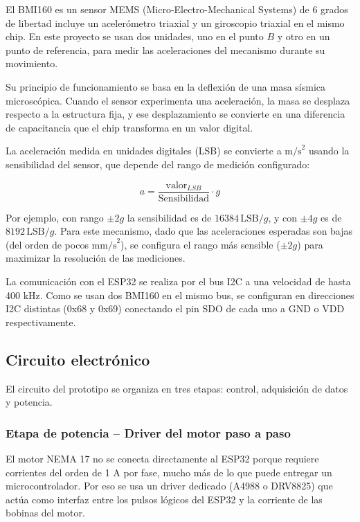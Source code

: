 El BMI160 es un sensor MEMS (Micro-Electro-Mechanical Systems) de 6 grados de libertad incluye un acelerómetro triaxial y un giroscopio triaxial en el mismo
chip. En este proyecto se usan dos unidades, uno en el punto $B$ y otro en un punto de
referencia, para medir las aceleraciones del mecanismo durante su movimiento.

Su principio de funcionamiento se basa en la deflexión de una masa sísmica microscópica.
Cuando el sensor experimenta una aceleración, la masa se desplaza respecto a la estructura
fija, y ese desplazamiento se convierte en una diferencia de capacitancia que el chip
transforma en un valor digital.

La aceleración medida en unidades digitales (LSB) se convierte a $\text{m/s}^2$ usando
la sensibilidad del sensor, que depende del rango de medición configurado:

\begin{equation}
	a = \frac{\text{valor}_{LSB}}{\text{Sensibilidad}} \cdot g
\end{equation}

Por ejemplo, con rango $\pm 2g$ la sensibilidad es de $16384\,\text{LSB}/g$, y con
$\pm 4g$ es de $8192\,\text{LSB}/g$. Para este mecanismo, dado que las aceleraciones
esperadas son bajas (del orden de pocos $\text{mm/s}^2$), se configura el rango más
sensible ($\pm 2g$) para maximizar la resolución de las mediciones.

La comunicación con el ESP32 se realiza por el bus I2C a una velocidad de hasta 400 kHz.
Como se usan dos BMI160 en el mismo bus, se configuran en direcciones I2C distintas
(0x68 y 0x69) conectando el pin SDO de cada uno a GND o VDD respectivamente.

\subsection{Circuito electrónico}

El circuito del prototipo se organiza en tres etapas: control, adquisición de datos y
potencia.
\subsubsection{Etapa de potencia -- Driver del motor paso a paso}

El motor NEMA 17 no se conecta directamente al ESP32 porque requiere corrientes del orden
de 1 A por fase, mucho más de lo que puede entregar un microcontrolador. Por eso se usa
un driver dedicado (A4988 o DRV8825) que actúa como interfaz entre los pulsos lógicos
del ESP32 y la corriente de las bobinas del motor.

